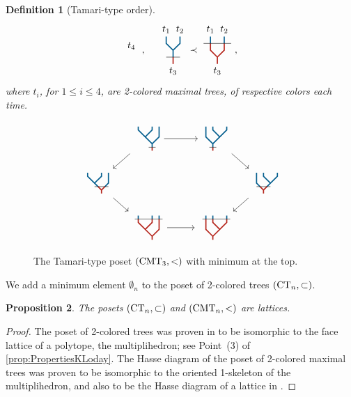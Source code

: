 \documentclass[twoside, 12pt]{amsart}
\newtheorem{definition}{Definition}[section]
\newtheorem{proposition}[definition]{Proposition}
\theoremstyle{remark}
\begin{document}
\begin{definition}[Tamari-type order]
\[{{{\begin{tikzpicture}[yscale=0.5,xscale=0.5]
\draw (0,-0.5) node[below] {$t_4$}; 
\end{tikzpicture}}}}\ , \quad 
{\vcenter{\hbox{
\begin{tikzpicture}[yscale=0.5,xscale=0.5]
\draw[very thick, MidnightBlue] (0,0.5)--(0,1);
\draw[very thick, MidnightBlue] (0,1)--(-0.5,1.5)--(-0.5,2);
\draw[very thick, MidnightBlue] (0,1)--(0.5,1.5)--(0.5,2);
% 
\draw[very thick, BrickRed] (0,0)--(0,0.5);
\draw (-0.5,0.5) --(0.5, 0.5);
%
\draw (-0.5,2) node[above] {$t_1$}; 
\draw (0.5,2) node[above] {$t_2$}; 
\draw (0,0) node[below] {$t_3$}; 
\end{tikzpicture}}}}
\prec
{\vcenter{\hbox{
\begin{tikzpicture}[yscale=0.5,xscale=0.5]
\draw[very thick, MidnightBlue] (-0.5,2)--(-0.5,2.5);
\draw[very thick, MidnightBlue] (0.5,2)--(0.5,2.5);
%
\draw[very thick, BrickRed] (0,0.5)--(0,1);
\draw[very thick, BrickRed] (0,1)--(-0.5,1.5)--(-0.5,2);
\draw[very thick, BrickRed] (0,1)--(0.5,1.5)--(0.5,2);
% 
\draw (-1,2) --(1, 2);
%
\draw (-0.5,2.5) node[above] {$t_1$}; 
\draw (0.5,2.5) node[above] {$t_2$}; 
\draw (0,0.5) node[below] {$t_3$}; 
\end{tikzpicture}}}}
\ ,\]
where $t_i$, for $1\leq i\leq 4$, are 2-colored maximal trees, of respective colors each time. 
\end{definition}

\begin{figure}[h]
\[\vcenter{\hbox{
\begin{tikzcd}[column sep=0.5cm, row sep=0.5cm]
& \TreeLa \arrow[ld, thin] \arrow[rr, thin]&& \TreeRa \arrow[rd, thin]& \\
\TreeLb \arrow[rd, thin] &&&& \TreeRb \arrow[ld, thin] \\
& \TreeLc \arrow[rr, thin] && \TreeRc &
\end{tikzcd}
}}\]
\caption{The Tamari-type poset $(\mathrm{CMT}_{3}, <)$ with minimum at the top.}
\label{Fig3:Tam}
\end{figure}

\noindent We add a minimum element $\emptyset_n$ to the poset of 2-colored trees $(\mathrm{CT}_{n}, \subset)$. 

\begin{proposition}
The posets $(\mathrm{CT}_{n}, \subset)$ and $(\mathrm{CMT}_{n}, <)$ are lattices. 
\end{proposition}

\begin{proof}
The poset of 2-colored trees was proven in \cite{Forcey08} to be isomorphic to the face lattice of a polytope, the multiplihedron; see Point~(3) of \cref{prop:PropertiesKLoday}. 
The Hasse diagram of the poset of 2-colored maximal trees was proven to be isomorphic to the oriented 1-skeleton of the multiplihedron, and also to be the Hasse diagram of a lattice in \cite[Proposition 117]{CP22}.
\end{proof}
\end{document}
